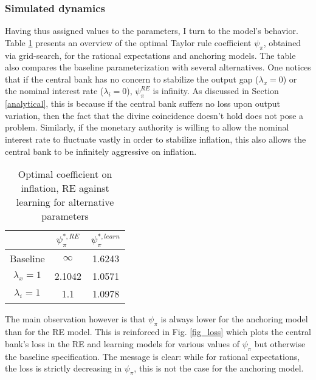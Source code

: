 \documentclass[11pt]{article}
\renewcommand{\[}{\begin{equation}}
\renewcommand{\]}{\end{equation}}
\begin{document}
\subsubsection{Simulated dynamics}

Having thus assigned values to the parameters, I turn to the model's behavior. Table \ref{par_opt} presents an overview of the optimal Taylor rule coefficient $\psi_{\pi}$, obtained via grid-search, for the rational expectations and anchoring models. The table also compares the baseline parameterization with several alternatives. One notices that if the central bank has no concern to stabilize the output gap ($\lambda_x = 0$) or the nominal interest rate ($\lambda_i =0$), $\psi_{\pi}^{RE}$ is infinity. As discussed in Section \ref{analytical}, this is because if the central bank suffers no loss upon output variation, then the fact that the divine coincidence doesn't hold does not pose a problem. Similarly, if the monetary authority is willing to allow the nominal interest rate to fluctuate vastly in order to stabilize inflation, this also allows the central bank to be infinitely aggressive on inflation. 

\begin{center}
\begin{table}[h!]
\begin{tabular}{ c | c | c }
 & $\psi^{*,RE}_{\pi}$ & $\psi^{*,learn}_{\pi}$  \\  \hline
  Baseline  & $\infty$  & 1.6243 \\  \hline
 $\lambda_x =1 $ & 2.1042  & 1.0571 \\  \hline
 $\lambda_i =1 $ &  1.1  & 1.0978 \\  \hline
\end{tabular}     
      \caption{Optimal coefficient on inflation, RE against learning for alternative parameters}  \label{par_opt}
 \end{table}
\end{center}

\vspace{-1.4cm}
The main observation however is that $\psi_{\pi}$ is always lower for the anchoring model than for the RE model. This is reinforced in Fig. \ref{fig_loss} which plots the central bank's loss in the RE and learning models for various values of $\psi_{\pi}$ but otherwise the baseline specification. The message is clear: while for rational expectations, the loss is strictly decreasing in $\psi_{\pi}$, this is not the case for the anchoring model. 
\end{document}

